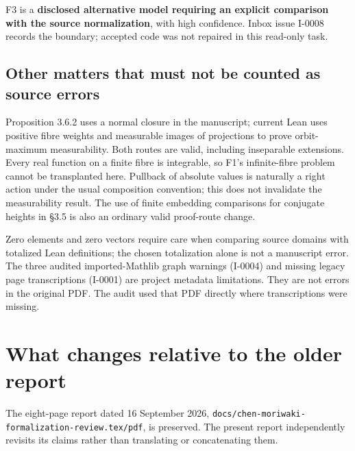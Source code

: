 \documentclass[11pt,a4paper]{article}
\newcommand{\code}[1]{{\small\nolinkurl{#1}}}
\begin{document}
F3 is a \textbf{disclosed alternative model requiring an explicit comparison with the source normalization}, with high confidence. Inbox issue I-0008 records the boundary; accepted code was not repaired in this read-only task.

\subsection{Other matters that must not be counted as source errors}
Proposition 3.6.2 uses a normal closure in the manuscript; current Lean uses positive fibre weights and measurable images of projections to prove orbit-maximum measurability. Both routes are valid, including inseparable extensions. Every real function on a finite fibre is integrable, so F1's infinite-fibre problem cannot be transplanted here. Pullback of absolute values is naturally a right action under the usual composition convention; this does not invalidate the measurability result. The use of finite embedding comparisons for conjugate heights in \S3.5 is also an ordinary valid proof-route change.

Zero elements and zero vectors require care when comparing source domains with totalized Lean definitions; the chosen totalization alone is not a manuscript error. The three audited imported-Mathlib graph warnings (I-0004) and missing legacy page transcriptions (I-0001) are project metadata limitations. They are not errors in the original PDF. The audit used that PDF directly where transcriptions were missing.

\section{What changes relative to the older report}
The eight-page report dated 16 September 2026,
\code{docs/chen-moriwaki-formalization-review.tex/pdf}, is preserved. The present report independently revisits its claims rather than translating or concatenating them.
\end{document}

